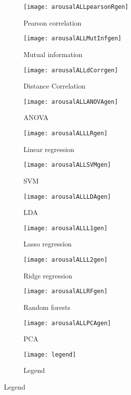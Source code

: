 \clearpage
\begin{figure}[!tbp]
  \centering
  \caption{Selection features for arousal classification.\label{arousalpiesgen}}
  \begin{subfigure}[b]{0.3\textwidth}
    \texttt{[image: arousalALLpearsonRgen]}
    \caption{Pearson correlation}
  \end{subfigure}
  \hfill
  \begin{subfigure}[b]{0.3\textwidth}
    \texttt{[image: arousalALLMutInfgen]}
    \caption{Mutual information}
  \end{subfigure}
  \hfill
  \begin{subfigure}[b]{0.3\textwidth}
    \texttt{[image: arousalALLdCorrgen]}
    \caption{Distance Correlation}
  \end{subfigure}
  
  \begin{subfigure}[b]{0.3\textwidth}
    \texttt{[image: arousalALLANOVAgen]}
    \caption{ANOVA}
  \end{subfigure}
  \hfill
  \begin{subfigure}[b]{0.3\textwidth}
    \texttt{[image: arousalALLLRgen]}
    \caption{Linear regression}
  \end{subfigure}
  \hfill
  \begin{subfigure}[b]{0.3\textwidth}
    \texttt{[image: arousalALLSVMgen]}
    \caption{SVM}
  \end{subfigure}
  
  \begin{subfigure}[b]{0.3\textwidth}
    \texttt{[image: arousalALLLDAgen]}
    \caption{LDA}
  \end{subfigure}
  \hfill
  \begin{subfigure}[b]{0.3\textwidth}
    \texttt{[image: arousalALLL1gen]}
    \caption{Lasso regression}
  \end{subfigure}
  \hfill
  \begin{subfigure}[b]{0.3\textwidth}
    \texttt{[image: arousalALLL2gen]}
    \caption{Ridge regression}
  \end{subfigure}
  
  \begin{subfigure}[b]{0.3\textwidth}
    \texttt{[image: arousalALLRFgen]}
    \caption{Random forests}
  \end{subfigure}
  \hfill
  \begin{subfigure}[b]{0.3\textwidth}
    \texttt{[image: arousalALLPCAgen]}
    \caption{PCA}
  \end{subfigure}
  \hfill
  \begin{subfigure}[b]{0.3\textwidth}
    \texttt{[image: legend]}
    \caption{Legend\label{arousalpieslegendgen}}
  \end{subfigure}
\end{figure}

